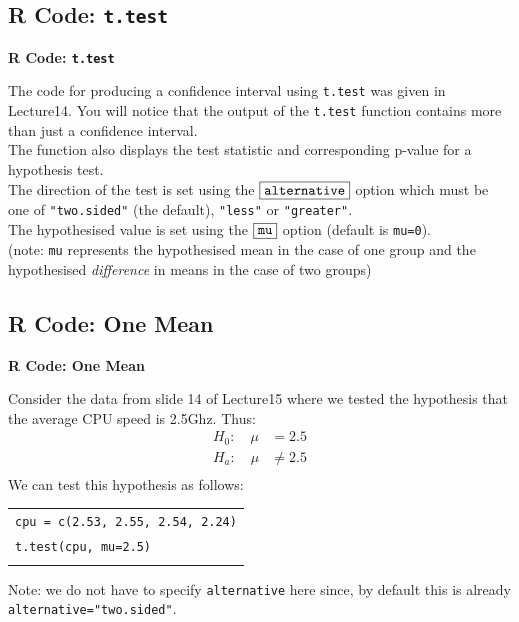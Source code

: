 \documentclass[compress]{beamer}        %
\makeatletter
\newcommand{\tcb}{\textcolor{beamer@blendedblue}}
\makeatother
\begin{document}
\subsection{R Code: \texttt{t.test}}
\begin{frame}{\bf \tcb{R Code: \texttt{t.test}}}

The code for producing a confidence interval using \texttt{t.test} was given in Lecture14. You will notice that the output of the \texttt{t.test} function contains more than just a confidence interval.\\[0.8cm]

The function also displays the test statistic and corresponding p-value for a hypothesis test.\\[0.8cm]

The direction of the test is set using the $\boxed{\text{\texttt{alternative}}}$ option which must be one of  \texttt{"two.sided"} (the default),  \texttt{"less"} or \texttt{"greater"}.\\[0.8cm]

The hypothesised value is set using the $\boxed{\text{\texttt{mu}}}$ option (default is \texttt{mu=0}).\\[0.1cm]
{\footnotesize(note: \texttt{mu} represents the hypothesised mean in the case of one group and the hypothesised \emph{difference} in means in the case of two groups)}

\end{frame}


\subsection{R Code: One Mean}
\begin{frame}{\bf \tcb{R Code: One Mean}}

Consider the data from slide 14 of Lecture15 where we tested the hypothesis that the average CPU speed is 2.5Ghz. Thus:\\[-0.4cm]
\begin{align*}
H_0: \quad \mu &= 2.5\\[0.2cm]
H_a: \quad \mu &\ne 2.5\\[-0.5cm]
\end{align*}
We can test this hypothesis as follows:\\[0.3cm]
\begin{tabular}{|l|}
\hline
\texttt{cpu = c(2.53, 2.55, 2.54, 2.24)}\\[0.2cm]
\texttt{t.test(cpu, mu=2.5)}\\
\hline
\multicolumn{1}{c}{}\\[0.2cm]
\end{tabular}

Note: we do not have to specify \texttt{alternative} here since, by default this is already \texttt{alternative="two.sided"}.


\end{frame}
\end{document}
